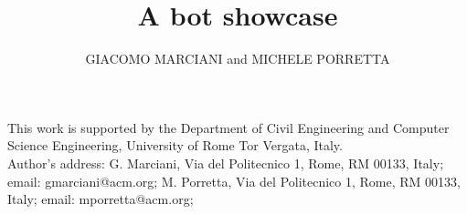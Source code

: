 \documentclass[prodmode,acmutv-cw-cs]{acmlarge}
\title{A bot showcase}
\author{GIACOMO MARCIANI and MICHELE PORRETTA \affil{University of Rome Tor Vergata}}
\numberwithin{equation}{section}
\begin{document}
\begin{bottomstuff}
	This work is supported by the Department of Civil Engineering and Computer Science
	Engineering, University of Rome Tor Vergata, Italy.\\
	Author's address:
	G. Marciani, Via del Politecnico 1, Rome, RM 00133, Italy;
	email: gmarciani@acm.org;
	M. Porretta, Via del Politecnico 1, Rome, RM 00133, Italy;
	email: mporretta@acm.org;
\end{bottomstuff}

\maketitle















\end{document}
